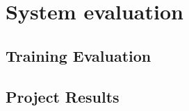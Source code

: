 \chapter{System evaluation}
\label{cha:789}
\section{Training Evaluation}
\begin{figure}[h!]
    	\centerline{}
\end{figure}
\section{Project Results}